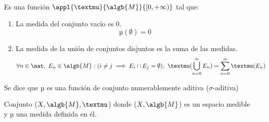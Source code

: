 \documentclass{apuntes}
\begin{document}
\begin{defn}
Es una función $\appl{µ}{\algb{M}}{[0, +\infty)}$ tal que:
\begin{enumerate}
\item La medida del conjunto vacío es 0.
\[µ(\emptyset)=0\]
\item La medida de la unión de conjuntos disjuntos es la suma de las medidas.
\[\forall n \in  \nat, \ E_n \in \algb{M}: (i\neq j \implies E_i\cap E_j = \emptyset), \ µ(\bigcup_{n=0}^{\infty}E_n)=\sum_{n=0}^{\infty}µ(E_n)\]
\end{enumerate}

Se dice que µ es una función de conjunto numerablemente aditiva ($\sigma$-aditiva)
\end{defn}

\begin{defn}
Conjunto ($X, \algb{M}, µ$) donde ($X, \algb{M}$) es un espacio medible y µ una medida definida en él.
\end{defn}
\end{document}
